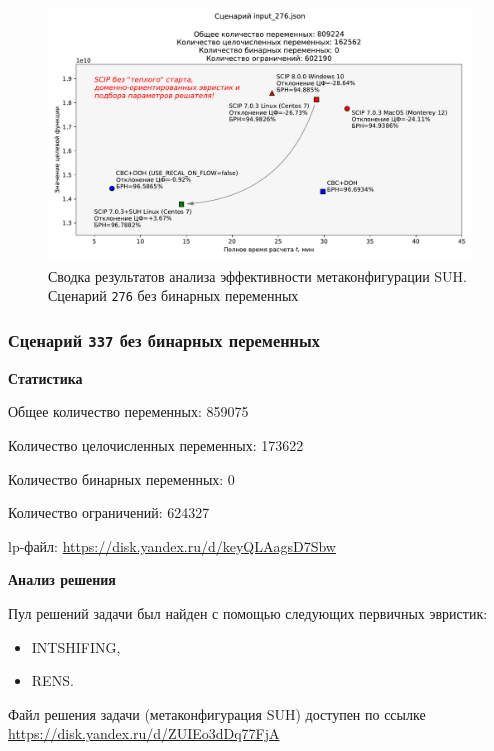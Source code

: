 \documentclass[%
	11pt,
	a4paper,
	utf8,
		]{article}
\begin{document}
\begin{figure}[!h]
	\centering
	\includegraphics[scale=0.6]{figures/summary_276.pdf}
	\caption{Сводка результатов анализа эффективности метаконфигурации SUH. \\Сценарий \texttt{276} без бинарных переменных}\label{fig:summary_276}
\end{figure}

\subsubsection{Сценарий \texttt{337} без бинарных переменных}

\textbf{Статистика}\vspace*{1mm}

Общее количество переменных: 859075

Количество целочисленных переменных: 173622

Количество бинарных переменных: 0

Количество ограничений: 624327

lp-файл: \url{https://disk.yandex.ru/d/keyQLAagsD7Sbw}

\vspace*{5mm}\textbf{Анализ решения}\vspace*{1mm}

Пул решений задачи был найден с помощью следующих первичных эвристик:
\begin{itemize}
	\item INTSHIFING,
	
	\item RENS.
\end{itemize}

Файл решения задачи (метаконфигурация SUH) доступен по ссылке \url{https://disk.yandex.ru/d/ZUIEo3dDq77FjA}
\end{document}
